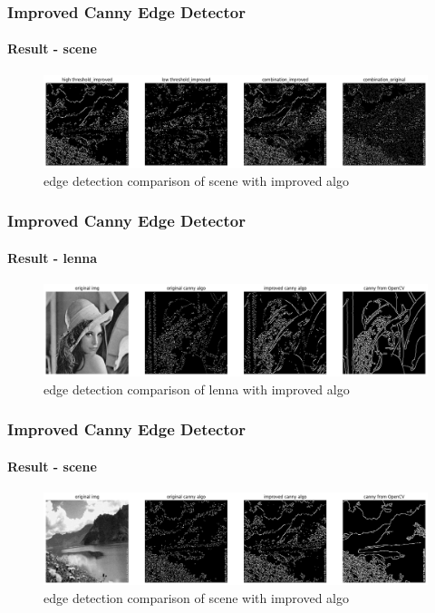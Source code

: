 \documentclass[
	11pt, %
	aspectratio=169, %
]{beamer}
\begin{document}
\begin{frame}
	\frametitle{Improved Canny Edge Detector}
	\framesubtitle{Result - scene}

	\begin{figure}
		\includegraphics[width=0.9\linewidth]{scene_threshold_compare_im.png}
		\caption{edge detection comparison of scene with improved algo}
	\end{figure}

\end{frame}

\begin{frame}
	\frametitle{Improved Canny Edge Detector}
	\framesubtitle{Result - lenna}

	\begin{figure}
		\includegraphics[width=0.9\linewidth]{lenna_edge_compare_im.png}
		\caption{edge detection comparison of lenna with improved algo}
	\end{figure}

\end{frame}

\begin{frame}
	\frametitle{Improved Canny Edge Detector}
	\framesubtitle{Result - scene}

	\begin{figure}
		\includegraphics[width=0.9\linewidth]{scene_edge_compare_im.png}
		\caption{edge detection comparison of scene with improved algo}
	\end{figure}

\end{frame}
\end{document}
